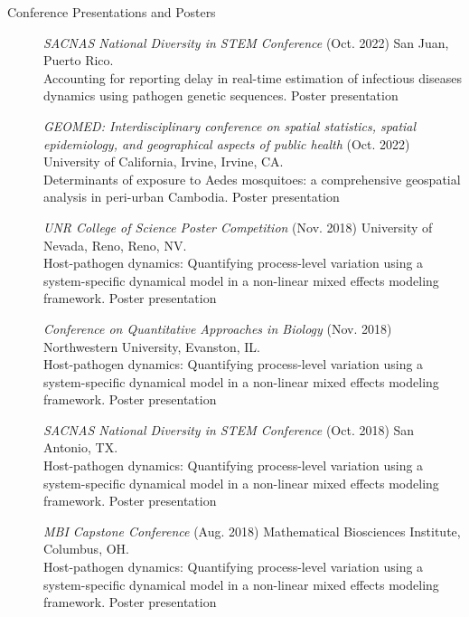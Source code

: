 \documentclass{article}
\begin{document}
\begin{description}
	\vspace{-2mm}
	\item[Conference Presentations and Posters]\hspace*{.1in} 
		

		\textit{SACNAS National Diversity in STEM Conference} (Oct. 2022) San Juan, Puerto Rico.\\
		Accounting for reporting delay in real-time estimation of infectious diseases dynamics using pathogen genetic sequences. Poster presentation
		\vspace*{1mm}
		
		\textit{GEOMED: Interdisciplinary conference on spatial statistics, spatial epidemiology, and geographical aspects of public health} (Oct. 2022) University of California, Irvine, Irvine, CA.\\ 
		Determinants of exposure to Aedes mosquitoes: a comprehensive geospatial analysis in peri-urban Cambodia. Poster presentation 
		\vspace*{1mm}
		
		\textit{UNR College of Science Poster Competition} (Nov. 2018) University of Nevada, Reno, Reno, NV.\\
		Host-pathogen dynamics: Quantifying process-level variation using a system-specific dynamical model in a non-linear mixed effects modeling framework. Poster presentation 
		\vspace*{1mm}
		
		\textit{Conference on Quantitative Approaches in Biology} (Nov. 2018) Northwestern University, Evanston, IL.\\
		Host-pathogen dynamics: Quantifying process-level variation using a system-specific dynamical model in a non-linear mixed effects modeling framework. Poster presentation
		\vspace*{1mm}
		
		\textit{SACNAS National Diversity in STEM Conference} (Oct. 2018) San Antonio, TX.\\
		Host-pathogen dynamics: Quantifying process-level variation using a system-specific dynamical model in a non-linear mixed effects modeling framework. Poster presentation
		\vspace*{1mm}
		 
		\textit{MBI Capstone Conference} (Aug. 2018) Mathematical Biosciences Institute, Columbus, OH.\\
		Host-pathogen dynamics: Quantifying process-level variation using a system-specific dynamical model in a non-linear mixed effects modeling framework. Poster presentation
		\vspace*{1mm}
		

\end{description}
\end{document}
